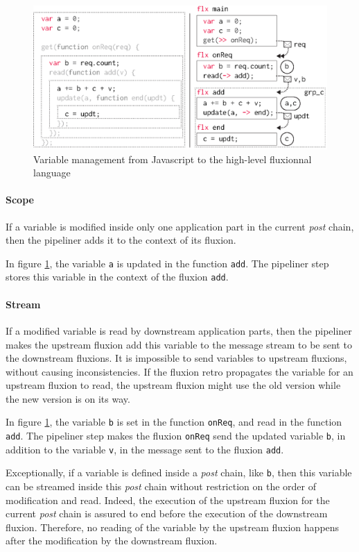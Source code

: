\begin{figure}[h!]
  \includegraphics[width=\linewidth]{states.ps}
  \caption{Variable management from Javascript to the high-level fluxionnal language}
  \label{fig:states}
\end{figure}

\paragraph{Scope}
If a variable is modified inside only one application part in the current \textit{post} chain, then the pipeliner adds it to the context of its fluxion.

In figure \ref{fig:states}, the variable \texttt{a} is updated in the function \texttt{add}.
The pipeliner step stores this variable in the context of the fluxion \texttt{add}.

\paragraph{Stream}
If a modified variable is read by downstream application parts, then the pipeliner makes the upstream fluxion add this variable to the message stream to be sent to the downstream fluxions.
It is impossible to send variables to upstream flux\-ions, without causing inconsistencies.
If the fluxion retro propagates the variable for an upstream fluxion to read, the upstream fluxion might use the old version while the new version is on its way.

In figure \ref{fig:states}, the variable \texttt{b} is set in the function \texttt{onReq}, and read in the function \texttt{add}.
The pipeliner step makes the fluxion \texttt{onReq} send the updated variable \texttt{b}, in addition to the variable \texttt{v}, in the message sent to the fluxion \texttt{add}.

Exceptionally, if a variable is defined inside a \textit{post} chain, like \texttt{b}, then this variable can be streamed inside this \textit{post} chain without restriction on the order of modification and read.
Indeed, the execution of the upstream fluxion for the current \textit{post} chain is assured to end before the execution of the downstream fluxion.
Therefore, no reading of the variable by the upstream fluxion happens after the modification by the downstream fluxion.

